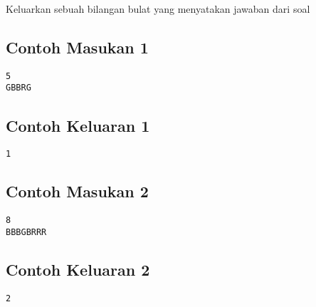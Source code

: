 \documentclass{article}
\begin{document}
Keluarkan sebuah bilangan bulat yang menyatakan jawaban dari soal 
\\

\begin{multicols}{2}
\subsection*{Contoh Masukan 1}
\begin{lstlisting}
5
GBBRG
\end{lstlisting}
\columnbreak
\subsection*{Contoh Keluaran 1}
\begin{lstlisting}
1
\end{lstlisting}
\vfill
\null
\end{multicols}

\begin{multicols}{2}
\subsection*{Contoh Masukan 2}
\begin{lstlisting}
8
BBBGBRRR
\end{lstlisting}
\columnbreak
\subsection*{Contoh Keluaran 2}
\begin{lstlisting}
2
\end{lstlisting}
\vfill
\null
\end{multicols}


\pagebreak
\end{document}
